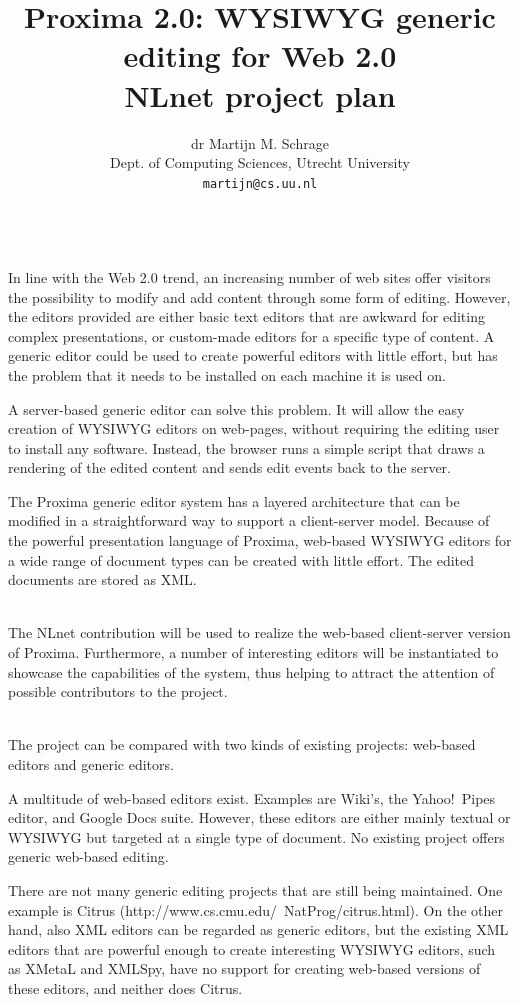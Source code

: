 \documentclass[10pt]{article}
\title{Proxima 2.0: WYSIWYG generic editing for Web 2.0\\
\bigskip
        \large NLnet project plan}
\author{dr Martijn M. Schrage\\
        \small Dept. of Computing Sciences, Utrecht University\\
        \small {\tt martijn@cs.uu.nl}
        }
\date{}
\begin{document}
\maketitle


\\
In line with the Web 2.0 trend, an increasing number of web sites offer visitors the possibility to modify and add content through some form of editing. However, the editors provided are either basic text editors that are awkward for editing complex presentations, or custom-made editors for a specific type of content. A generic editor could be used to create powerful editors with little effort, but has the problem that it needs to be installed on each machine it is used on.

A server-based generic editor can solve this problem. It will allow the easy creation of WYSIWYG editors on web-pages, without requiring the editing user to install any software. Instead, the browser runs a simple script that draws a rendering of the edited content and sends edit events back to the server.

The Proxima generic editor system has a layered architecture that can be modified in a straightforward way to support a client-server model. Because of the powerful presentation language of Proxima, web-based WYSIWYG editors for a wide range of document types can be created with little effort. The edited documents are stored as XML.

\\
The NLnet contribution will be used to realize the web-based client-server version of Proxima. Furthermore, a number of interesting editors will be instantiated to showcase the capabilities of the system, thus helping to  attract the attention of possible contributors to the project.


\\
The project can be compared with two kinds of existing projects: web-based editors and generic editors.

A multitude of web-based editors exist. Examples are Wiki's, the Yahoo!\ Pipes editor, and Google Docs suite. However, these editors are either mainly textual or WYSIWYG but targeted at a single type of document. No existing project offers generic web-based editing.

There are not many generic editing projects that are still being maintained. One example is Citrus (http://www.cs.cmu.edu/~NatProg/citrus.html). On the other hand, also XML editors can be regarded as generic editors, but the existing XML editors that are powerful enough to create interesting WYSIWYG editors, such as XMetaL and XMLSpy, have no support for creating web-based versions of these editors, and neither does Citrus.
\end{document}
